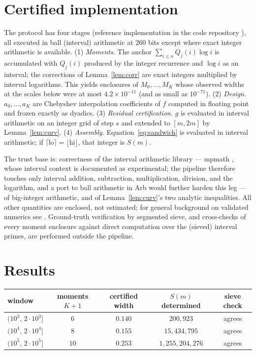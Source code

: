 \documentclass[11pt]{article}
\theoremstyle{remark}
\begin{document}
\section{Certified implementation}

The protocol has four stages (reference implementation in the code repository \cite{Code}), all
executed in ball (interval) arithmetic at $260$ bits except where exact integer arithmetic is
available. (1) \emph{Moments.} The anchor $\sum_{i \le n} Q_j(i) \log i$ is
accumulated with $Q_j(i)$ produced by the integer recurrence and $\log i$ as an interval; the
corrections of Lemma~\ref{lem:corr} are exact integers multiplied by interval logarithms. This yields
enclosures of $M_0, \dots, M_K$ whose observed widths at the scales below were at most
$4.2 \times 10^{-11}$ (and as small as $10^{-71}$). (2) \emph{Design.} $a_0, \dots, a_K$ are Chebyshev
interpolation coefficients of $f$ computed in floating point and frozen exactly as dyadics. (3)
\emph{Residual certification.} $g$ is evaluated in interval arithmetic on an integer grid of step $s$
and extended to $[m, 2m]$ by Lemma~\ref{lem:curv}. (4) \emph{Assembly.} Equation~\eqref{eq:sandwich} is
evaluated in interval arithmetic; if $\lceil \text{lo} \rceil = \lfloor \text{hi} \rfloor$, that integer
is $S(m)$.

The trust base is: correctness of the interval arithmetic library --- mpmath \cite{mpmath}, whose
interval context is documented as experimental; the pipeline therefore touches only interval
addition, subtraction, multiplication, division, and the logarithm, and a port to ball arithmetic in
Arb \cite{Arb} would further harden this leg --- of big-integer arithmetic, and of
Lemma~\ref{lem:curv}'s two analytic inequalities. All other quantities are enclosed, not
estimated; for general background on validated numerics see \cite{Tucker}. Ground-truth verification
by segmented sieve, and cross-checks of every moment enclosure
against direct computation over the (sieved) interval primes, are performed outside the pipeline.

\section{Results}

\begin{center}
\begin{tabular}{lcccc}
\hline
window & moments $K{+}1$ & certified width & $S(m)$ determined & sieve check \\
\hline
$(10^3,\,2\cdot 10^3]$ & $6$ & $0.140$ & $200{,}923$ & agrees \\
$(10^4,\,2\cdot 10^4]$ & $8$ & $0.155$ & $15{,}434{,}795$ & agrees \\
$(10^5,\,2\cdot 10^5]$ & $10$ & $0.253$ & $1{,}255{,}204{,}276$ & agrees \\
\hline
\end{tabular}
\end{center}
\end{document}
